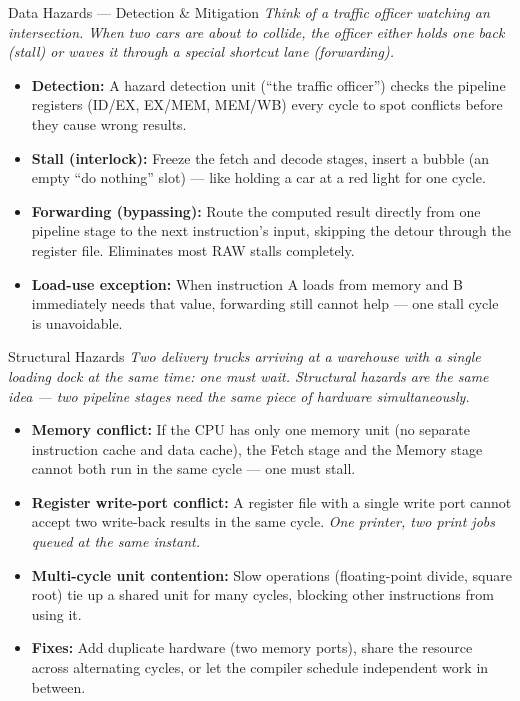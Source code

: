 \documentclass{beamer}
\begin{document}
\begin{frame}{Data Hazards --- Detection \& Mitigation}
  \textit{Think of a traffic officer watching an intersection. When two cars
  are about to collide, the officer either holds one back (stall) or waves it
  through a special shortcut lane (forwarding).}

  \medskip
  \begin{itemize}
    \item \textbf{Detection:} A hazard detection unit (``the traffic officer'')
          checks the pipeline registers (ID/EX, EX/MEM, MEM/WB) every cycle
          to spot conflicts before they cause wrong results.
    \item \textbf{Stall (interlock):} Freeze the fetch and decode stages,
          insert a bubble (an empty ``do nothing'' slot) --- like holding a car
          at a red light for one cycle.
    \item \textbf{Forwarding (bypassing):} Route the computed result directly
          from one pipeline stage to the next instruction's input, skipping the
          detour through the register file. Eliminates most RAW stalls completely.
    \item \textbf{Load-use exception:} When instruction A loads from memory and
          B immediately needs that value, forwarding still cannot help --- one
          stall cycle is unavoidable.
  \end{itemize}
\end{frame}

\begin{frame}{Structural Hazards}
  \textit{Two delivery trucks arriving at a warehouse with a single loading dock
  at the same time: one must wait. Structural hazards are the same idea ---
  two pipeline stages need the same piece of hardware simultaneously.}

  \medskip
  \begin{itemize}
    \item \textbf{Memory conflict:} If the CPU has only one memory unit (no
          separate instruction cache and data cache), the Fetch stage and the
          Memory stage cannot both run in the same cycle --- one must stall.
    \item \textbf{Register write-port conflict:} A register file with a single
          write port cannot accept two write-back results in the same cycle.
          \textit{One printer, two print jobs queued at the same instant.}
    \item \textbf{Multi-cycle unit contention:} Slow operations (floating-point
          divide, square root) tie up a shared unit for many cycles, blocking
          other instructions from using it.
    \item \textbf{Fixes:} Add duplicate hardware (two memory ports), share the
          resource across alternating cycles, or let the compiler schedule
          independent work in between.
  \end{itemize}
\end{frame}
\end{document}

